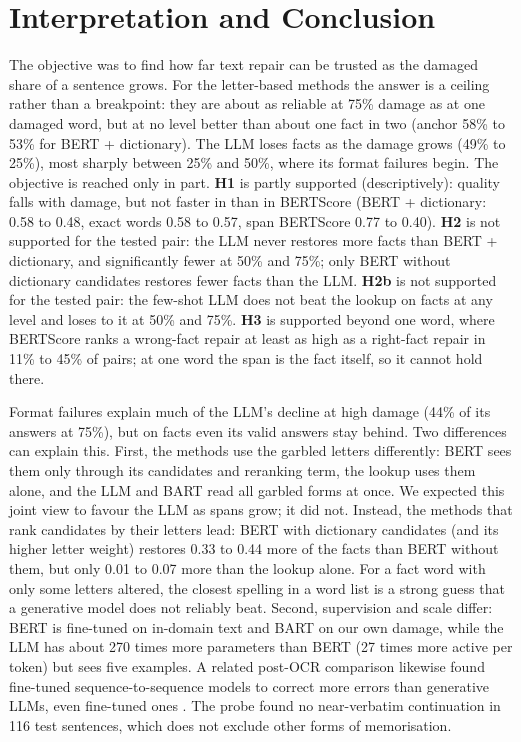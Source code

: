 \section{Interpretation and Conclusion}
\label{sec:interpretation}

The objective was to find how far text repair can be trusted as the damaged share of a sentence grows. For the
letter-based methods the answer is a ceiling rather than a breakpoint: they are about as reliable at 75\% damage as
at one damaged word, but at no level better than about one fact in two (anchor 58\% to 53\% for BERT +
dictionary). The LLM loses facts as the damage grows (49\% to 25\%), most sharply between 25\% and 50\%, where its
format failures begin. The objective is reached only in
part. \textbf{H1} is partly supported (descriptively): quality falls with damage, but not faster in \frr{} than in
BERTScore (BERT + dictionary: \frr{} 0.58 to 0.48, exact words 0.58 to 0.57, span BERTScore 0.77 to 0.40). \textbf{H2} is not supported for the tested pair: the LLM never restores more
facts than BERT + dictionary, and significantly fewer at 50\% and 75\%; only BERT without dictionary candidates
restores fewer facts than the LLM. \textbf{H2b} is not supported for the tested pair: the few-shot LLM does not beat
the lookup on facts at any level and loses to it at 50\% and 75\%. \textbf{H3} is supported beyond one word, where
BERTScore ranks a wrong-fact repair at least as high as a right-fact repair in 11\% to 45\% of pairs; at one word
the span is the fact itself, so it cannot hold there.

Format failures explain much of the LLM's decline at high damage (44\% of its answers at 75\%), but on facts even its
valid answers stay behind. Two differences can
explain this. First, the methods use the garbled letters differently: BERT sees them only through its candidates and
reranking term, the lookup uses them alone, and the LLM and BART read all garbled forms at once. We expected this
joint view to favour the LLM as spans grow; it did not. Instead, the methods that rank candidates by their letters lead: BERT with dictionary candidates (and its higher
letter weight) restores 0.33 to 0.44 more of the facts than BERT without them, but only 0.01 to 0.07 more than the
lookup alone. For a fact word with only some letters altered, the closest spelling in a word list is a strong guess
that a generative model does not reliably beat. Second, supervision and scale differ: BERT is
fine-tuned on in-domain text and BART on our own damage, while the LLM has about 270 times more parameters than BERT
(27 times more active per token) but sees five examples. A related post-OCR comparison likewise found fine-tuned
sequence-to-sequence models to correct more errors than generative LLMs, even fine-tuned ones \citep{debaene2025evaluating}. The probe found no near-verbatim continuation in 116 test sentences, which does not exclude other forms of memorisation.

